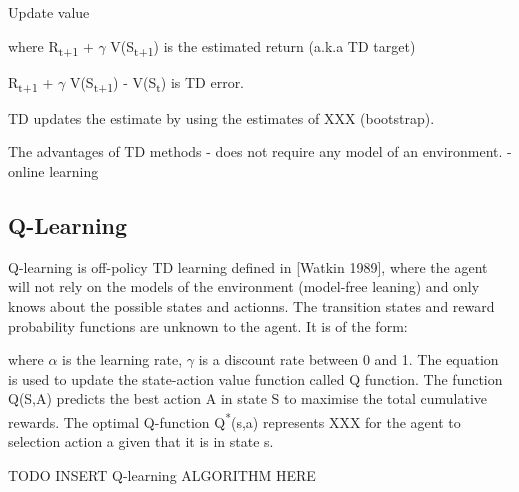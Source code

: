 \documentclass[12pt,twoside]{report}
\begin{document}
Update value


where R\textsubscript{t+1} + $\gamma$ V(S\textsubscript{t+1}) is the estimated return (a.k.a TD target)

R\textsubscript{t+1} + $\gamma$ V(S\textsubscript{t+1}) - V(S\textsubscript{t}) is TD error.

TD updates the estimate by using the estimates of XXX (bootstrap).

The advantages of TD methods
- does not require any model of an environment.
- online learning

\subsection{Q-Learning}

Q-learning is off-policy TD learning defined in [Watkin 1989], where the agent will not rely on the models of the environment (model-free leaning) and only knows about the possible states and actionns. The transition states and reward probability functions are unknown to the agent.
It is of the form:

%
where $\alpha$ is the learning rate, $\gamma$ is a discount rate between 0 and 1. The equation is used to update the state-action value function called Q function. The function Q(S,A) predicts the best action A in state S to maximise the total cumulative rewards.
The optimal Q-function Q\textsuperscript{*}(s,a) represents XXX for the agent to selection action a given that it is in state s.


TODO INSERT Q-learning ALGORITHM HERE
\end{document}
